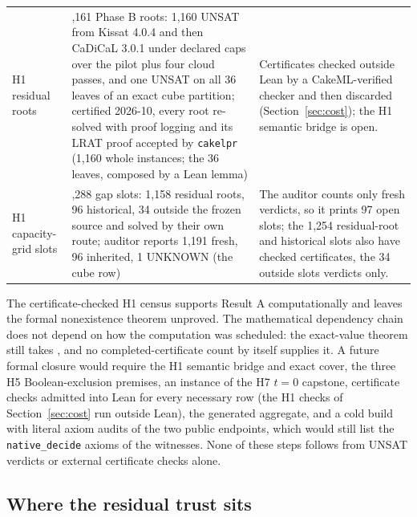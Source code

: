 \documentclass{anvil-paper}
\newcommand{\hnoFortyNine}{\lean{hno49}}
\newcommand{\cakelpr}{\texttt{cake\textunderscore lpr}}
\theoremstyle{definition}
\begin{document}
\begin{table}[htbp]
\begin{tabularx}{\textwidth}{@{}>{\raggedright\arraybackslash}p{}>{\raggedright\arraybackslash}X>{\raggedright\arraybackslash}p{}@{}}
H1 residual roots & 1,161 Phase B roots: 1,160 UNSAT from Kissat 4.0.4 and then CaDiCaL 3.0.1 under declared caps over the pilot plus four cloud passes, and one UNSAT on all 36 leaves of an exact cube partition; certified 2026-10, every root re-solved with proof logging and its LRAT proof accepted by \cakelpr{} (1,160 whole instances; the 36 leaves, composed by a Lean lemma) & Certificates checked outside Lean by a CakeML-verified checker and then discarded (Section~\ref{sec:cost}); the H1 semantic bridge is open. \\
H1 capacity-grid slots & 1,288 gap slots: 1,158 residual roots, 96 historical, 34 outside the frozen source and solved by their own route; auditor reports 1,191 fresh, 96 inherited, 1 UNKNOWN (the cube row) & The auditor counts only fresh verdicts, so it prints 97 open slots; the 1,254 residual-root and historical slots also have checked certificates, the 34 outside slots verdicts only. \\
\bottomrule
\end{tabularx}
\end{table}

The certificate-checked H1 census supports Result A computationally and leaves the formal nonexistence theorem unproved. The mathematical dependency chain does not depend on how the computation was scheduled: the exact-value theorem still takes \hnoFortyNine, and no completed-certificate count by itself supplies it. A future formal closure would require the H1 semantic bridge and exact cover, the three H5 Boolean-exclusion premises, an instance of the H7 $t=0$ capstone, certificate checks admitted into Lean for every necessary row (the H1 checks of Section~\ref{sec:cost} run outside Lean), the generated aggregate, and a cold build with literal axiom audits of the two public endpoints, which would still list the \texttt{native\_decide} axioms of the witnesses. None of these steps follows from UNSAT verdicts or external certificate checks alone.

\subsection{Where the residual trust sits}\label{sec:trust}
\end{document}
